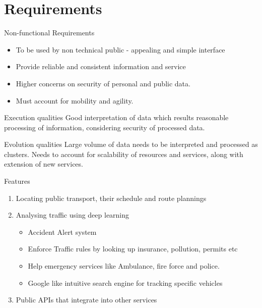 \documentclass{beamer}
\begin{document}
	\section{Requirements}
	\begin{frame}{Non-functional Requirements}
		\begin{itemize}
			\item To be used by non technical public - appealing and simple interface
			\item Provide reliable and consistent information and service
			\item Higher concerns on security of personal and public data.
			\item Must account for mobility and agility.
		\end{itemize}
		
		\begin{block}{Execution qualities}
			Good interpretation of data which results reasonable processing of information, considering security of processed data.
		\end{block}
		
		\begin{block}{Evolution qualities}
			Large volume of data needs to be interpreted and processed as clusters. Needs to account for scalability of resources and services, along with extension of new services.
		\end{block}
	\end{frame}
	
	\begin{frame}{Features}
		\begin{enumerate}
			\item Locating public transport, their schedule and route plannings
			\item Analysing traffic using deep learning
			\begin{itemize}
				\item Accident Alert system
				\item Enforce Traffic rules by looking up insurance, pollution, permits etc
				\item Help emergency services like Ambulance, fire force and police.
				\item Google like intuitive search engine for tracking specific vehicles
			\end{itemize}
			\item Public APIs that integrate into other services
		\end{enumerate}
	\end{frame}
	
\end{document}

